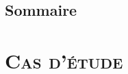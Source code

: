 \documentclass[xcolor=x11names, compress, 11pt]{beamer}
\begin{document}
\subsection{Sommaire}
\begin{frame}
\tableofcontents[hideallsubsections]
\addtocounter{page}{-1}
\end{frame}


















\section{\scshape Cas d’étude}



\end{document}
